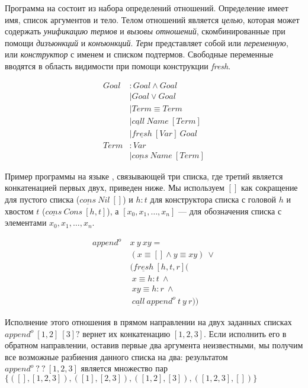 \documentclass[conference]{IEEEtran}
\begin{document}
Программа на \miniKanren{} состоит из набора определений отношений. 
Определение имеет имя, список аргументов и тело.
Телом отношений является \emph{целью}, которая может содержать \emph{унификацию термов} и \emph{вызовы отношений}, скомбинированные при помощи \emph{дизъюнкций} и \emph{конъюнкций}. 
\emph{Терм} представляет собой или \emph{переменную}, или \emph{конструктор} с именем и списком подтермов. 
Свободные переменные вводятся в область видимости при помощи конструкции \emph{fresh}. 

\begin{align*}
  Goal &: Goal \wedge Goal \\
       &\mid Goal \vee Goal \\
       &\mid Term \equiv Term \\
       &\mid \underline{call} \ Name \ [Term] \\
       &\mid \underline{fresh} \ [Var] \ Goal \\
  Term &: Var \\ 
       &\mid \underline{cons} \ Name \ [Term]
\end{align*}

Пример программы на языке \miniKanren, связывающей три списка, где третий является конкатенацией первых двух, приведен ниже. Мы используем $[]$ как сокращение для пустого списка ($\underline{cons} \ Nil \ []$) и $h : t$ для конструктора списка с головой $h$ и хвостом $t$ ($\underline{cons} \ Cons \ [h, t]$), а $[x_0, x_1, \dots, x_n]$ --- для обозначения списка с элементами $x_0, x_1, \dots, x_n$.

\begin{align*}
append^o \ &x \ y \ xy = \\
           &(x \equiv [] \wedge y \equiv xy) \ \vee \\
           &(\underline{fresh} \ [h, t, r] ( \\
           & \ x \equiv h : t \ \wedge \\
           & \ xy \equiv h : r \ \wedge \\ 
           & \ \underline{call} \ append^o \ t \ y \ r ))
\end{align*}

Исполнение этого отношения в прямом направлении на двух заданных списках $append^o \ [1,2] \ [3] ?$ вернет их конкатенацию $[1,2,3]$. 
Если исполнить его в обратном направлении, оставив первые два аргумента неизвестными, мы получим все возможные разбиения данного списка на два: результатом $append^o \ ? \ ? \ [1,2,3]$ является множество пар $\{([],[1,2,3]), ([1], [2,3]), ([1,2], [3]), ([1,2,3], [])\}$ 
\end{document}
